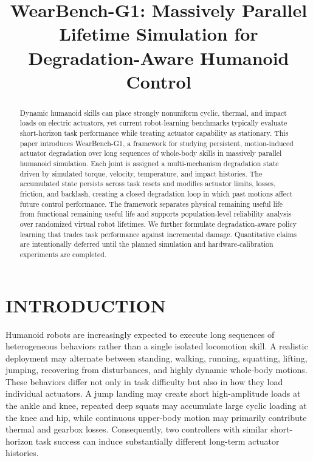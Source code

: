 \documentclass[letterpaper,10pt,conference]{ieeeconf}
\title{\LARGE \bf
WearBench-G1: Massively Parallel Lifetime Simulation for Degradation-Aware Humanoid Control
}
\author{}
\begin{document}
\maketitle
\thispagestyle{empty}
\pagestyle{empty}

\begin{abstract}
Dynamic humanoid skills can place strongly nonuniform cyclic, thermal, and impact loads on electric actuators, yet current robot-learning benchmarks typically evaluate short-horizon task performance while treating actuator capability as stationary. This paper introduces WearBench-G1, a framework for studying persistent, motion-induced actuator degradation over long sequences of whole-body skills in massively parallel humanoid simulation. Each joint is assigned a multi-mechanism degradation state driven by simulated torque, velocity, temperature, and impact histories. The accumulated state persists across task resets and modifies actuator limits, losses, friction, and backlash, creating a closed degradation loop in which past motions affect future control performance. The framework separates physical remaining useful life from functional remaining useful life and supports population-level reliability analysis over randomized virtual robot lifetimes. We further formulate degradation-aware policy learning that trades task performance against incremental damage. Quantitative claims are intentionally deferred until the planned simulation and hardware-calibration experiments are completed.
\end{abstract}

\section{INTRODUCTION}

Humanoid robots are increasingly expected to execute long sequences of heterogeneous behaviors rather than a single isolated locomotion skill. A realistic deployment may alternate between standing, walking, running, squatting, lifting, jumping, recovering from disturbances, and highly dynamic whole-body motions. These behaviors differ not only in task difficulty but also in how they load individual actuators. A jump landing may create short high-amplitude loads at the ankle and knee, repeated deep squats may accumulate large cyclic loading at the knee and hip, while continuous upper-body motion may primarily contribute thermal and gearbox losses. Consequently, two controllers with similar short-horizon task success can induce substantially different long-term actuator histories.
\end{document}
